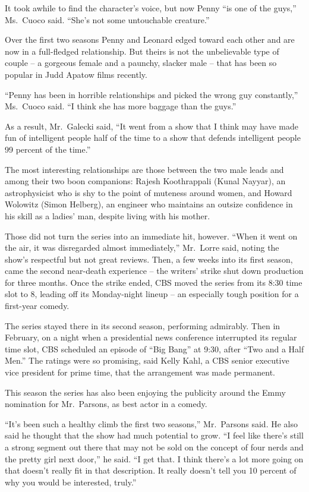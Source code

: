 ﻿\documentclass[12pt]{article}
\begin{document}
It took awhile to find the character's voice, but now Penny ``is one of the guys,'' Ms.~Cuoco said.
``She's not some untouchable creature.''

Over the first two seasons Penny and Leonard edged toward each other and are now in a full-fledged
relationship. But theirs is not the unbelievable type of couple -- a gorgeous female and a paunchy,
slacker male -- that has been so popular in Judd Apatow films recently.

``Penny has been in horrible relationships and picked the wrong guy constantly,'' Ms.~Cuoco said.
``I think she has more baggage\cite{baggage} than the guys.''

As a result, Mr.~Galecki said, ``It went from a show that I think may have made fun of intelligent
people half of the time to a show that defends intelligent people 99 percent of the time.''

The most interesting relationships are those between the two male leads and among their two boon
companions: Rajesh Koothrappali (Kunal Nayyar), an astrophysicist who is shy to the point of
muteness around women, and Howard Wolowitz (Simon Helberg), an engineer who maintains an outsize
confidence in his skill as a ladies' man, despite living with his mother.

Those did not turn the series into an immediate hit, however. ``When it went on the air, it was
disregarded almost immediately,'' Mr.~Lorre said, noting the show's respectful but not great
reviews. Then, a few weeks into its first season, came the second near-death experience -- the
writers' strike shut down production for three months. Once the strike ended, CBS moved the series
from its 8:30 time slot to 8, leading off its Monday-night lineup -- an especially tough position
for a first-year comedy.

The series stayed there in its second season, performing admirably. Then in February, on a night
when a presidential news conference interrupted its regular time slot, CBS scheduled an episode of
``Big Bang'' at 9:30, after ``Two and a Half Men.'' The ratings were so promising, said Kelly Kahl,
a CBS senior executive vice president for prime time, that the arrangement was made permanent.

This season the series has also been enjoying the publicity around the Emmy nomination for
Mr.~Parsons, as best actor in a comedy.

``It's been such a healthy climb the first two seasons,'' Mr.~Parsons said. He also said he thought
that the show had much potential to grow. ``I feel like there's still a strong segment out there
that may not be sold on the concept of four nerds and the pretty girl next door,'' he said. ``I get
that. I think there's a lot more going on that doesn't really fit in that description. It really
doesn't tell you 10 percent of why you would be interested, truly.''
\end{document}
